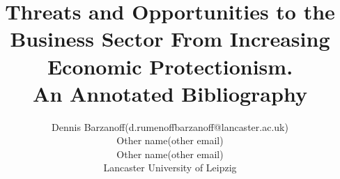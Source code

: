 \documentclass [11pt]{article}
\title{Threats and Opportunities to the Business Sector From
Increasing Economic Protectionism.\\\medskip An Annotated Bibliography}
\author{Dennis Barzanoff(d.rumenoffbarzanoff@lancaster.ac.uk)\\
Other name(other email)\\
Other name(other email)\\
Lancaster University of Leipzig}
\begin{document}
\maketitle
\nocite{*}


\end{document}
